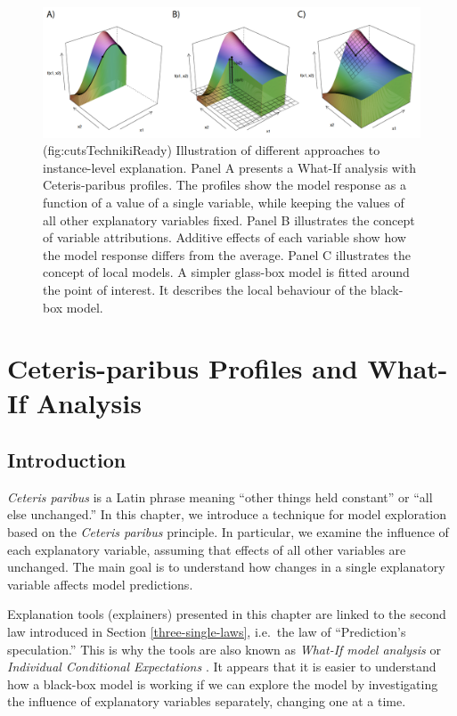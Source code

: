 \documentclass[12pt,]{krantz}
\theoremstyle{definition}
\theoremstyle{definition}
\theoremstyle{definition}
\theoremstyle{remark}
\begin{document}
\begin{figure}

{\centering \includegraphics[width=0.99\linewidth]{figure/cuts_techniki_ready} 

}

\caption{(fig:cutsTechnikiReady) Illustration of different approaches to instance-level explanation. Panel A presents a What-If analysis with Ceteris-paribus profiles. The profiles show the model response as a function of a value of a single variable, while keeping the values of all other explanatory variables fixed. Panel B illustrates the concept of variable attributions. Additive effects of each variable show how the model response differs from the average. Panel C illustrates the concept of local models. A simpler glass-box model is fitted around the point of interest. It describes the local behaviour of the black-box model. }\label{fig:cutsTechnikiReady}
\end{figure}

\hypertarget{ceterisParibus}{%
\section{Ceteris-paribus Profiles and What-If
Analysis}\label{ceterisParibus}}

\hypertarget{CPIntro}{%
\subsection{Introduction}\label{CPIntro}}

\emph{Ceteris paribus} is a Latin phrase meaning ``other things held
constant'' or ``all else unchanged.'' In this chapter, we introduce a
technique for model exploration based on the \emph{Ceteris paribus}
principle. In particular, we examine the influence of each explanatory
variable, assuming that effects of all other variables are unchanged.
The main goal is to understand how changes in a single explanatory
variable affects model predictions.

Explanation tools (explainers) presented in this chapter are linked to
the second law introduced in Section \ref{three-single-laws}, i.e.~the
law of ``Prediction's speculation.'' This is why the tools are also
known as \emph{What-If model analysis} or \emph{Individual Conditional
Expectations} \citep{ICEbox}. It appears that it is easier to understand
how a black-box model is working if we can explore the model by
investigating the influence of explanatory variables separately,
changing one at a time.
\end{document}
